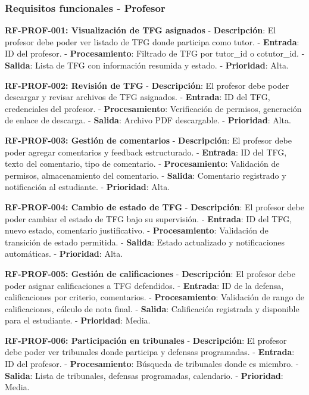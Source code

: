 \documentclass[12pt,a4paper,oneside]{report}
\begin{document}
\subsubsection{Requisitos funcionales -
Profesor}\label{requisitos-funcionales---profesor}

\textbf{RF-PROF-001: Visualización de TFG asignados} -
\textbf{Descripción}: El profesor debe poder ver listado de TFG donde
participa como tutor. - \textbf{Entrada}: ID del profesor. -
\textbf{Procesamiento}: Filtrado de TFG por tutor\_id o cotutor\_id. -
\textbf{Salida}: Lista de TFG con información resumida y estado. -
\textbf{Prioridad}: Alta.

\textbf{RF-PROF-002: Revisión de TFG} - \textbf{Descripción}: El
profesor debe poder descargar y revisar archivos de TFG asignados. -
\textbf{Entrada}: ID del TFG, credenciales del profesor. -
\textbf{Procesamiento}: Verificación de permisos, generación de enlace
de descarga. - \textbf{Salida}: Archivo PDF descargable. -
\textbf{Prioridad}: Alta.

\textbf{RF-PROF-003: Gestión de comentarios} - \textbf{Descripción}: El
profesor debe poder agregar comentarios y feedback estructurado. -
\textbf{Entrada}: ID del TFG, texto del comentario, tipo de comentario.
- \textbf{Procesamiento}: Validación de permisos, almacenamiento del
comentario. - \textbf{Salida}: Comentario registrado y notificación al
estudiante. - \textbf{Prioridad}: Alta.

\textbf{RF-PROF-004: Cambio de estado de TFG} - \textbf{Descripción}: El
profesor debe poder cambiar el estado de TFG bajo su supervisión. -
\textbf{Entrada}: ID del TFG, nuevo estado, comentario justificativo. -
\textbf{Procesamiento}: Validación de transición de estado permitida. -
\textbf{Salida}: Estado actualizado y notificaciones automáticas. -
\textbf{Prioridad}: Alta.

\textbf{RF-PROF-005: Gestión de calificaciones} - \textbf{Descripción}:
El profesor debe poder asignar calificaciones a TFG defendidos. -
\textbf{Entrada}: ID de la defensa, calificaciones por criterio,
comentarios. - \textbf{Procesamiento}: Validación de rango de
calificaciones, cálculo de nota final. - \textbf{Salida}: Calificación
registrada y disponible para el estudiante. - \textbf{Prioridad}: Media.

\textbf{RF-PROF-006: Participación en tribunales} -
\textbf{Descripción}: El profesor debe poder ver tribunales donde
participa y defensas programadas. - \textbf{Entrada}: ID del profesor. -
\textbf{Procesamiento}: Búsqueda de tribunales donde es miembro. -
\textbf{Salida}: Lista de tribunales, defensas programadas, calendario.
- \textbf{Prioridad}: Media.
\end{document}
